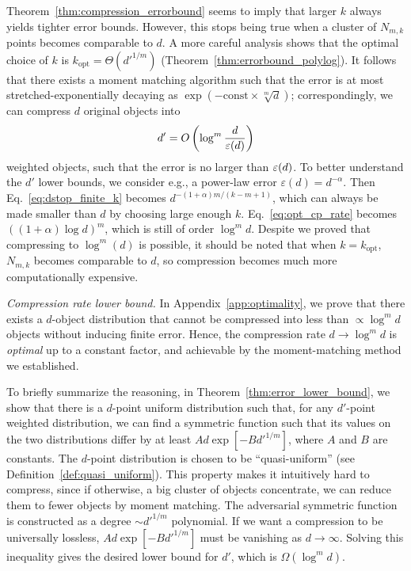 \documentclass{article}
\theoremstyle{plain}
\def\REV#1{{\color[HTML]{000000}#1}}
\newenvironment{REV*}
  {\begingroup\color[HTML]{000000}}
  {\endgroup}
\begin{document}
Theorem~\ref{thm:compression_errorbound} seems to imply that larger $k$ always yields tighter error bounds. However, this stops being true when a cluster of $N_{m,k}$ points becomes comparable to $d$. A more careful analysis shows that the optimal choice of $k$ is $k_{\mathrm{opt}} = \Theta(d'^{1/m})$ (Theorem~\ref{thm:errorbound_polylog}). It follows that there exists a moment matching algorithm such that the error is at most stretched-exponentially decaying as $\exp(-\mathrm{const}\times \sqrt[m]{d})$; correspondingly, we can compress $d$ original objects into
\begin{equation}\label{eq:opt_cp_rate}
    d' =  O \left(\log^m \frac{d}{\REV{\varepsilon}(d)} \right)
\end{equation}
weighted objects, such that the error is no larger than $\REV{\varepsilon}(d)$. \REV{To better understand the $d'$ lower bounds, we consider e.g., a power-law error $\varepsilon(d) = d^{-\alpha}$. Then Eq.~\eqref{eq:dstop_finite_k} becomes $d^{-(1+\alpha)m/(k-m+1)}$, which can always be made smaller than $d$ by choosing large enough $k$. Eq.~\eqref{eq:opt_cp_rate} becomes $((1+\alpha)\log d)^m$, which is still of order $\log^m d$.} Despite we proved that compressing to $\log^m (d)$ is possible, it should be noted that when $k=k_{\mathrm{opt}}$, $N_{m,k}$ becomes comparable to $d$, so compression becomes much more computationally expensive. 



\begin{REV*}
\textit{Compression rate lower bound.} In Appendix~\ref{app:optimality}, we prove that there exists a $d$-object distribution that cannot be compressed into less than $\propto \log^m d$ objects without inducing finite error. Hence, the compression rate $d\to \log^m d$ is \emph{optimal} up to a constant factor, and achievable by the moment-matching method we established. 

To briefly summarize the reasoning, in Theorem~\ref{thm:error_lower_bound}, we show that there is a $d$-point uniform distribution such that, for any $d'$-point weighted distribution, we can find a symmetric function such that its values on the two distributions differ by at least $A d \exp[ -B d'^{1/m} ]$, where $A$ and $B$ are constants. The $d$-point distribution is chosen to be ``quasi-uniform'' (see Definition~\ref{def:quasi_uniform}). This property makes it intuitively hard to compress, since if otherwise, a big cluster of objects concentrate, we can reduce them to fewer objects by moment matching. The adversarial symmetric function is constructed as a degree $\sim d'^{1/m}$ polynomial. If we want a compression to be universally lossless, $A d \exp[ -B d'^{1/m} ]$ must be vanishing as $d\to\infty$. Solving this inequality gives the desired lower bound for $d'$, which is $\Omega (\log^m d)$. 
\end{REV*}
\end{document}
